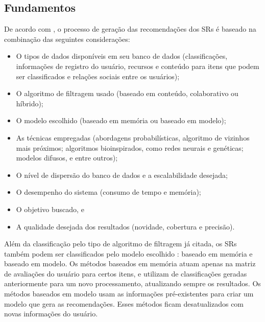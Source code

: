 \subsection{Fundamentos}

De acordo com , o processo de geração das recomendações dos SRs é baseado 
na combinação das seguintes considerações:


\begin{itemize}

	\item O tipos de dados disponíveis em seu banco de dados (classificações, informações de registro do usuário, recursos e conteúdo para itens que podem ser
	classificados e relações sociais entre os usuários); 

	\item O algoritmo de filtragem usado (baseado em conteúdo, colaborativo ou híbrido);

	\item O modelo escolhido (baseado em memória ou baseado em modelo);
	
	\item As técnicas empregadas (abordagens probabilísticas, algoritmo de vizinhos mais próximos;
	algoritmos bioinspirados, como redes neurais e genéticas; modelos difusos, e entre outros);
	
	\item  O nível de dispersão do banco de dados e a escalabilidade desejada;

	\item  O desempenho do sistema (consumo de tempo e memória);

	\item  O objetivo buscado, e

	\item A qualidade desejada dos resultados (novidade, cobertura e
   precisão).

\end{itemize}

Além da classificação pelo tipo de algoritmo de filtragem já citada, os SRs também podem 
ser classificados pelo modelo escolhido \cite{bobadilla2013}: baseado em memória e baseado em modelo. 
Os métodos baseados em memória atuam apenas na matriz de avaliações do usuário para certos itens, e utilizam de 
classificações geradas anteriormente para um novo processamento, atualizando sempre os resultados. 
Os métodos baseados em modelo usam as informações pré-existentes para criar um
modelo que gera as recomendações. Esses métodos ficam desatualizados com novas informações do usuário.

